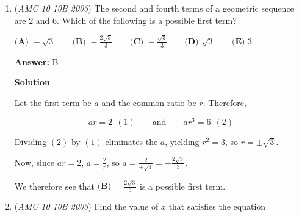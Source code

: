 \begin{enumerate}
 
            \begin{itemize}
        \item <ul><li>Step 2: Group repeated values**</li></ul>
            \end{itemize}
            1+1+1 = 3  

 2+2+2+2+2 = 10  

 3+3+3+3+3+3+3 = 21  

 4 = 4

 ---

 
            \begin{itemize}
        \item <ul><li>Step 3: Add them together**</li></ul>
            \end{itemize}
            3 + 10 + 21 + 4 = 38

 ---

 
            \begin{itemize}
        \item <ul><li>Answer:**</li></ul>
            \end{itemize}
            
 \[\boxed{38}\]



	\item (\textit{AMC 10 10B 2003}) The second and fourth terms of a geometric sequence are $2$ and $6$. Which of the following is a possible first term?


 $\textbf{(A) } -\sqrt{3}  \qquad\textbf{(B) } -\frac{2\sqrt{3}}{3} \qquad\textbf{(C) } -\frac{\sqrt{3}}{3} \qquad\textbf{(D) } \sqrt{3} \qquad\textbf{(E) } 3$

 \textbf{Answer: }B



\textbf{Solution}

Let the first term be $a$ and the common ratio be $r$. Therefore, 

 
 \[ar=2\ \ (1) \qquad \text{and} \qquad ar^3=6\ \ (2)\]

 Dividing $(2)$ by $(1)$ eliminates the $a$, yielding $r^2=3$, so $r=\pm\sqrt{3}$.

 Now, since $ar=2$, $a=\frac{2}{r}$, so $a=\frac{2}{\pm\sqrt{3}}=\pm\frac{2\sqrt{3}}{3}$.

 We therefore see that $\boxed{\textbf{(B)}\ -\frac{2\sqrt{3}}{3}}$ is a possible first term.

 


	\item (\textit{AMC 10 10B 2003}) Find the value of $x$ that satisfies the equation


\end{enumerate}
